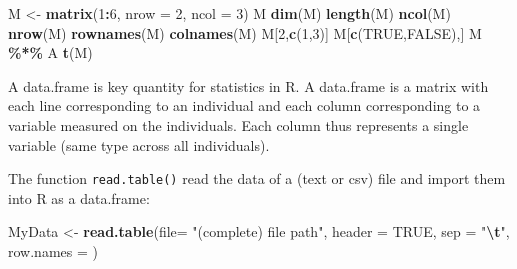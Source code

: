 \documentclass[
]{book}
\newenvironment{Shaded}{\begin{snugshade}}{\end{snugshade}}
\newcommand{\AttributeTok}[1]{\textcolor[rgb]{0.13,0.29,0.53}{#1}}
\newcommand{\ConstantTok}[1]{\textcolor[rgb]{0.56,0.35,0.01}{#1}}
\newcommand{\DecValTok}[1]{\textcolor[rgb]{0.00,0.00,0.81}{#1}}
\newcommand{\FunctionTok}[1]{\textcolor[rgb]{0.13,0.29,0.53}{\textbf{#1}}}
\newcommand{\NormalTok}[1]{#1}
\newcommand{\OtherTok}[1]{\textcolor[rgb]{0.56,0.35,0.01}{#1}}
\newcommand{\SpecialCharTok}[1]{\textcolor[rgb]{0.81,0.36,0.00}{\textbf{#1}}}
\newcommand{\StringTok}[1]{\textcolor[rgb]{0.31,0.60,0.02}{#1}}
\begin{document}
\begin{Shaded}
\begin{Highlighting}[]
\NormalTok{M }\OtherTok{\textless{}{-}} \FunctionTok{matrix}\NormalTok{(}\DecValTok{1}\SpecialCharTok{:}\DecValTok{6}\NormalTok{, }\AttributeTok{nrow =} \DecValTok{2}\NormalTok{, }\AttributeTok{ncol =} \DecValTok{3}\NormalTok{)}
\NormalTok{M}
\FunctionTok{dim}\NormalTok{(M)}
\FunctionTok{length}\NormalTok{(M)}
\FunctionTok{ncol}\NormalTok{(M)}
\FunctionTok{nrow}\NormalTok{(M)}
\FunctionTok{rownames}\NormalTok{(M)}
\FunctionTok{colnames}\NormalTok{(M)}
\NormalTok{M[}\DecValTok{2}\NormalTok{,}\FunctionTok{c}\NormalTok{(}\DecValTok{1}\NormalTok{,}\DecValTok{3}\NormalTok{)]}
\NormalTok{M[}\FunctionTok{c}\NormalTok{(}\ConstantTok{TRUE}\NormalTok{,}\ConstantTok{FALSE}\NormalTok{),]}
\NormalTok{M }\SpecialCharTok{\%*\%}\NormalTok{ A}
\FunctionTok{t}\NormalTok{(M)}
\end{Highlighting}
\end{Shaded}

A data.frame is key quantity for statistics in R. A data.frame is a matrix with each line corresponding to an individual and each column corresponding to a variable measured on the individuals. Each column thus represents a single variable (same type across all individuals).

\begin{Shaded}
\end{Shaded}

The function \texttt{read.table()} read the data of a (text or csv) file and import them into R as a data.frame:

\begin{Shaded}
\begin{Highlighting}[]
\NormalTok{MyData }\OtherTok{\textless{}{-}} \FunctionTok{read.table}\NormalTok{(}\AttributeTok{file=} \StringTok{"(complete) file path"}\NormalTok{,}
                     \AttributeTok{header =} \ConstantTok{TRUE}\NormalTok{,}
                     \AttributeTok{sep =} \StringTok{"}\SpecialCharTok{\textbackslash{}t}\StringTok{"}\NormalTok{,}
                     \AttributeTok{row.names =}\NormalTok{ )}
\end{Highlighting}
\end{Shaded}
\end{document}
